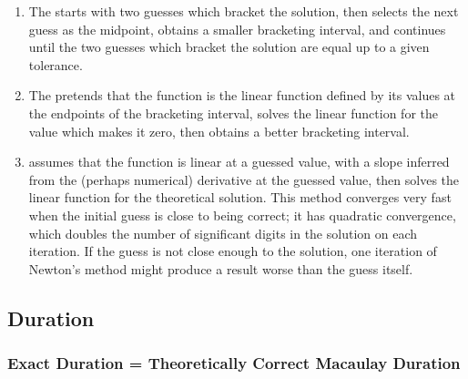 \documentclass[12pt]{scrartcl}
\begin{document}
\begin{enumerate}
    \item The  starts with two guesses which bracket the solution, then selects the next guess as the midpoint, obtains a smaller bracketing interval, and continues until the two guesses which bracket the solution are equal up to a given tolerance.
    \item The  pretends that the function is the linear function defined by its values at the endpoints of the bracketing interval, solves the linear function for the value which makes it zero, then obtains a better bracketing interval.
    \item {} assumes that the function is linear at a guessed value, with a slope inferred from the (perhaps numerical) derivative at the guessed value, then solves the linear function for the theoretical solution. This method converges very fast when the initial guess is close to being correct; it has quadratic convergence, which doubles the number of significant digits in the solution on each iteration. If the guess is not close enough to the solution, one iteration of Newton's method might produce a result worse than the guess itself.
\end{enumerate}

\subsection{Duration}


\subsubsection{Exact Duration = Theoretically Correct Macaulay Duration}

\end{document}
